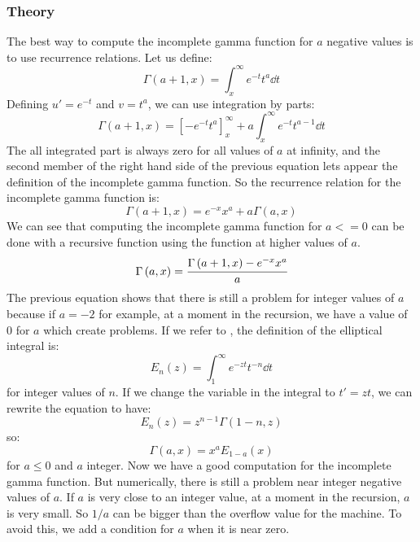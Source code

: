 \subsubsection{Theory}
%
The best way to compute the incomplete gamma function for $a$ negative values
is to use recurrence relations. Let us define:
%
\begin{equation}
    \Gamma\left({a+1,x}\right)=\int_x^\infty{e^{-t}{t^{a}}\dd{t}}
\end{equation}
%
Defining $u'=e^{-t}$ and $v=t^a$, we can use integration by parts:
%
\begin{equation}
    \Gamma\left({a+1,x}\right)={\left[-e^{-t}{t^a}\right]}_x^\infty + a \int_x^\infty{e^{-t}{t^{a-1}}\dd{t}}
\end{equation}
%
The all integrated part is always zero for all values of $a$ at infinity, and
the second member of the right hand side of the previous equation lets appear
the definition of the incomplete gamma function. So the recurrence relation for
the incomplete gamma function is:
%
\begin{equation}
    \Gamma\left({a+1,x}\right)=e^{-x}{x^a} + a \Gamma\left({a,x}\right)
\end{equation}
%
We can see that computing the incomplete gamma function for $a<=0$ can be done
with a recursive function using the function at higher values of $a$.
%
\begin{equation}
    \Gamma\left({a,x}\right)= \cfrac{\Gamma\left({a+1,x}\right) - e^{-x}{x^a}}{a}
\end{equation}
%
The previous equation shows that there is still a problem for integer values of
$a$ because if $a=-2$ for example, at a moment in the recursion, we have a
value of 0 for $a$ which create problems. If we refer to
\citet{abramowitz+stegun}, the definition of the elliptical integral is:
%
\begin{equation}
    E_n\left({z}\right)=\int_1^\infty{e^{-zt}}{t^{-n}}\dd{t}
\end{equation}
%
for integer values of $n$. If we change the variable in the integral to
$t'=zt$, we can rewrite the equation to have:
%
\begin{equation}
    E_n\left({z}\right)={z^{n-1}}\Gamma\left({1-n,z}\right)
\end{equation}
%
so:
%
\begin{equation}
    \Gamma\left({a,x}\right)={x^a}E_{1-a}\left({x}\right)
\end{equation}
%
for $a\leq0$ and $a$ integer. Now we have a good computation for the incomplete
gamma function. But numerically, there is still a problem near integer negative
values of $a$. If $a$ is very close to an integer value, at a moment in the
recursion, $a$ is very small. So $1/a$ can be bigger than the overflow value
for the machine. To avoid this, we add a condition for $a$ when it is near
zero.

